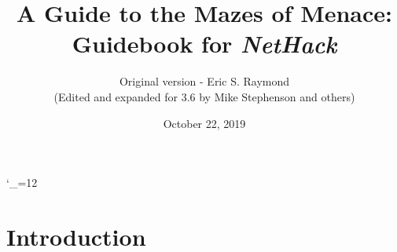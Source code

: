 \textheight 220mm
\textwidth 160mm
\oddsidemargin 0mm
\evensidemargin 0mm
\topmargin 0mm

\newcommand{\nd}{\noindent}

\newcommand{\tb}[1]{\tt #1 \hfill}
\newcommand{\bb}[1]{\bf #1 \hfill}
\newcommand{\ib}[1]{\it #1 \hfill}

\newcommand{\blist}[1]
{\begin{list}{$\bullet$}
    {\leftmargin 30mm \topsep 2mm \partopsep 0mm \parsep 0mm \itemsep 1mm
     \labelwidth 28mm \labelsep 2mm
     #1}}

\newcommand{\elist}{\end{list}}

\catcode`\_=12


%
%

\title{\LARGE A Guide to the Mazes of Menace:\\
\Large Guidebook for {\it NetHack\/}}

\author{Original version - Eric S. Raymond\\
(Edited and expanded for 3.6 by Mike Stephenson and others)}
\date{October 22, 2019}

\maketitle

\section{Introduction}


